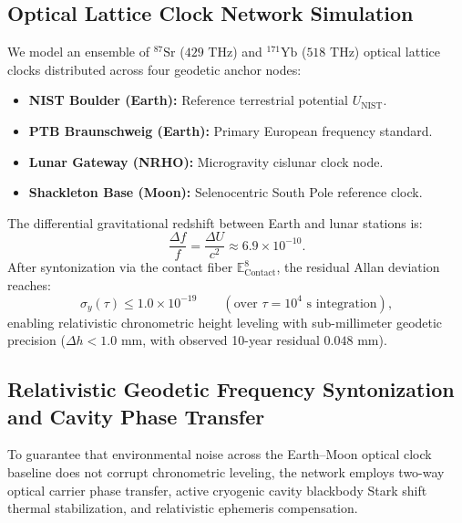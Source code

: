 \documentclass[11pt,a4paper,reqno]{article}
\theoremstyle{plain}
\theoremstyle{definition}
\theoremstyle{remark}
\numberwithin{equation}{section}
\numberwithin{table}{section}
\newcommand{\Econtact}{\mathbb{E}_{\mathrm{Contact}}^8}
\begin{document}
\subsection{Optical Lattice Clock Network Simulation}
We model an ensemble of $^{87}\mathrm{Sr}$ ($429\text{ THz}$) and $^{171}\mathrm{Yb}$ ($518\text{ THz}$) optical lattice clocks distributed across four geodetic anchor nodes:
\begin{itemize}
  \item \textbf{NIST Boulder (Earth):} Reference terrestrial potential $U_{\mathrm{NIST}}$.
  \item \textbf{PTB Braunschweig (Earth):} Primary European frequency standard.
  \item \textbf{Lunar Gateway (NRHO):} Microgravity cislunar clock node.
  \item \textbf{Shackleton Base (Moon):} Selenocentric South Pole reference clock.
\end{itemize}

The differential gravitational redshift between Earth and lunar stations is:
\begin{equation}
  \frac{\Delta f}{f} = \frac{\Delta U}{c^2} \approx 6.9 \times 10^{-10}.
\end{equation}
After syntonization via the contact fiber $\Econtact$, the residual Allan deviation reaches:
\begin{equation}
  \sigma_y(\tau) \le 1.0 \times 10^{-19} \qquad (\text{over } \tau = 10^4\text{ s integration}),
\end{equation}
enabling relativistic chronometric height leveling with sub-millimeter geodetic precision ($\Delta h < 1.0\text{ mm}$, with observed 10-year residual $0.048\text{ mm}$).

\subsection{Relativistic Geodetic Frequency Syntonization and Cavity Phase Transfer}
To guarantee that environmental noise across the Earth--Moon optical clock baseline does not corrupt chronometric leveling, the network employs two-way optical carrier phase transfer, active cryogenic cavity blackbody Stark shift thermal stabilization, and relativistic ephemeris compensation.
\end{document}

